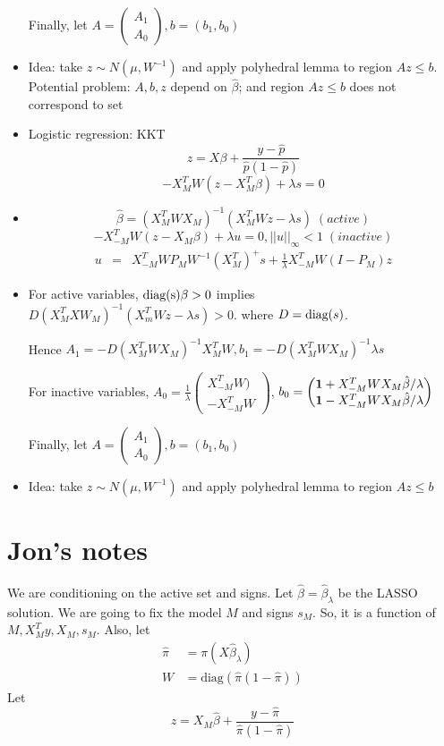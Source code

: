 \documentclass{article}
\def\be {{\bf 1}}
\begin{document}
\begin{itemize}
              Finally, let $A=\begin{pmatrix} A_1\\ A_0  \end{pmatrix}
, b=(b_1,b_0)$
              
\item Idea:  take $z\sim N(\mu,W^{-1})$  and apply polyhedral lemma to region $A z \leq b$.
Potential problem: $A,b, z$ depend on $\hat\beta$; and  region $A z \leq b$  does not correspond to set 
\item  Logistic regression: KKT
$$z=X\beta+\frac{y-\hat p}{\hat p(1-\hat p)}$$
$$ -X_M^T W(z- X_M^T\beta)+\lambda s=0$$
\item
$$\hat\beta=(X_M^TW X_M)^{-1}(X_M^TW z-\lambda s) \;(active) $$
$$-X_{-M}^T  W (z-X_M\beta)+\lambda u =0,  ||u||_\infty <1 \;(inactive) $$
\begin{eqnarray}
u&=&X_{-M}^T  W P_MW^{-1}(X_M^T)^+s+ \frac{1}{\lambda} X_{-M}^T W(I-P_M)z
\end{eqnarray}

\item For active variables,
${\rm diag(s)}\beta>0$ implies
$D(X_M^TXW_M)^{-1}(X_m^TW z-\lambda s)>0$. 
where $D={\rm diag(}s)$.

Hence
$A_1=-D(X_M^TWX_M)^{-1}X_M^TW, b_1=-D(X_M^TWX_M)^{-1}\lambda s$

For inactive variables,
$A_0=\frac{1}{\lambda} 
\begin{pmatrix}
 X_{-M}^T W) \\
   -X_{-M}^T W
   \end{pmatrix}
   $, $b_0= \begin{pmatrix}
              \be+X_{-M}^TWX_M\hat\beta/\lambda \\
                 \be-X_{-M}^TWX_M\hat\beta/\lambda
              \end{pmatrix}
              $
              
              Finally, let $A=\begin{pmatrix} A_1\\ A_0  \end{pmatrix}
, b=(b_1,b_0)$
              
\item Idea:  take $z\sim N(\mu,W^{-1})$  and apply polyhedral lemma to region $A z \leq b$
\end{itemize}


\section{Jon's notes}
We are conditioning on the active set and signs.
Let $\hat{\beta}=\hat{\beta}_{\lambda}$ be the LASSO solution. We are going to
fix the model $M$ and signs $s_M$. So, it is a function of
$M, X_M^Ty, X_M, s_M$.
Also, let
$$
\begin{aligned}
\hat{\pi} &= \pi(X\hat{\beta}_{\lambda}) \\
W &= \text{diag}(\hat{\pi}(1-\hat{\pi}))
\end{aligned}
$$
Let
$$
z = X_M\hat{\beta} + \frac{y - \hat{\pi}}{\hat{\pi}(1 - \hat{\pi})}
$$
\end{document}
